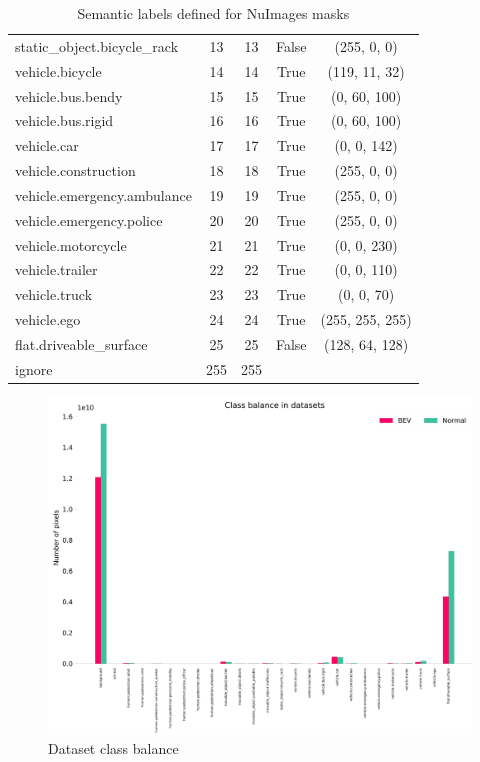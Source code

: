 \begin{table}[h]
\begin{tabular}{l c c c c}
        static\_object.bicycle\_rack        & 13 & 13 & False & (255, 0, 0) \\
        vehicle.bicycle                     & 14 & 14 & True  & (119, 11, 32) \\
        vehicle.bus.bendy                   & 15 & 15 & True  & (0, 60, 100) \\
        vehicle.bus.rigid                   & 16 & 16 & True  & (0, 60, 100) \\
        vehicle.car                         & 17 & 17 & True  & (0, 0, 142) \\
        vehicle.construction                & 18 & 18 & True  & (255, 0, 0) \\
        vehicle.emergency.ambulance         & 19 & 19 & True  & (255, 0, 0) \\
        vehicle.emergency.police            & 20 & 20 & True  & (255, 0, 0) \\
        vehicle.motorcycle                  & 21 & 21 & True  & (0, 0, 230) \\
        vehicle.trailer                     & 22 & 22 & True  & (0, 0, 110) \\
        vehicle.truck                       & 23 & 23 & True  & (0, 0, 70) \\
        vehicle.ego                         & 24 & 24 & True  & (255, 255, 255) \\
        flat.driveable\_surface             & 25 & 25 & False & (128, 64, 128) \\
        \midrule
        ignore                              & 255 & 255 &       &        \\
        \bottomrule
    \end{tabular}
    \caption{Semantic labels defined for NuImages masks}
    \label{tab:semantic_labels}
\end{table}

\begin{figure}[h!]
    \centering
    \includegraphics[width=\linewidth]{images/methodology/dataset_class_balance.png}
    \caption{Dataset class balance}
    \label{fig:dataset_class_balance}
\end{figure}

